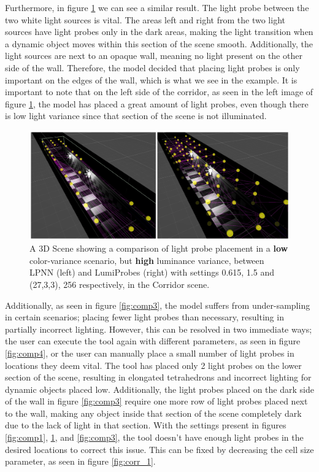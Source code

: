 Furthermore, in figure \ref{fig:comp2} we can see a similar result. The light probe between the two white light sources is vital. The areas left and right from the two light sources have light probes only in the dark areas, making the light transition when a dynamic object moves within this section of the scene smooth. Additionally, the light sources are next to an opaque wall, meaning no light present on the other side of the wall. Therefore, the model decided that placing light probes is only important on the edges of the wall, which is what we see in the example. It is important to note that on the left side of the corridor, as seen in the left image of figure \ref{fig:comp2}, the model has placed a great amount of light probes, even though there is low light variance since that section of the scene is not illuminated. 

\begin{figure}[h]
	\centering
	\includegraphics[width=\linewidth]{Graphics/results/concats/comparison2.png}
	\caption{A 3D Scene showing a comparison of light probe placement in a \textbf{low} color-variance scenario, but \textbf{high} luminance variance, between LPNN (left) and LumiProbes (right) with settings 0.615, 1.5 and (27,3,3), 256 respectively, in the Corridor scene.}
	\label{fig:comp2}
\end{figure}

Additionally, as seen in figure \ref{fig:comp3}, the model suffers from under-sampling in certain scenarios; placing fewer light probes than necessary, resulting in partially incorrect lighting. However, this can be resolved in two immediate ways; the user can execute the tool again with different parameters, as seen in figure \ref{fig:comp4}, or the user can manually place a small number of light probes in locations they deem vital. The tool has placed only 2 light probes on the lower section of the scene, resulting in elongated tetrahedrons and incorrect lighting for dynamic objects placed low. Additionally, the light probes placed on the dark side of the wall in figure \ref{fig:comp3} require one more row of light probes placed next to the wall, making any object inside that section of the scene completely dark due to the lack of light in that section. With the settings present in figures \ref{fig:comp1}, \ref{fig:comp2}, and \ref{fig:comp3}, the tool doesn't have enough light probes in the desired locations to correct this issue. This can be fixed by decreasing the cell size parameter, as seen in figure \ref{fig:corr_1}.

